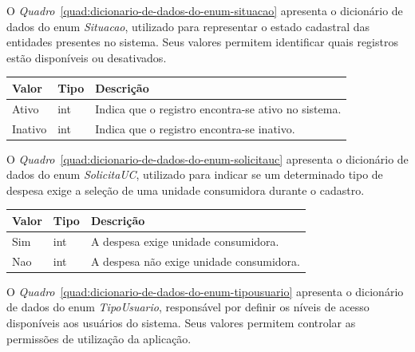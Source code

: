 O \textit{Quadro}~\ref{quad:dicionario-de-dados-do-enum-situacao} apresenta o dicionário de dados do enum \textit{Situacao}, utilizado para representar o estado cadastral das entidades presentes no sistema. Seus valores permitem identificar quais registros estão disponíveis ou desativados.

\begin{quadro}[H]
\caption[Dicionário de dados do enum Situacao]{Dicionário de dados do enum Situacao}
\label{quad:dicionario-de-dados-do-enum-situacao}

\begin{tabular}{|p{}|p{}|p{}|}
\hline
\textbf{Valor} & \textbf{Tipo} & \textbf{Descrição} \\ 
\hline
Ativo & int & Indica que o registro encontra-se ativo no sistema. \\ 
\hline
Inativo & int & Indica que o registro encontra-se inativo. \\ 
\hline
\end{tabular}


\end{quadro}


O \textit{Quadro}~\ref{quad:dicionario-de-dados-do-enum-solicitauc} apresenta o dicionário de dados do enum \textit{SolicitaUC}, utilizado para indicar se um determinado tipo de despesa exige a seleção de uma unidade consumidora durante o cadastro.

\begin{quadro}[H]
\caption[Dicionário de dados do enum SolicitaUC]{Dicionário de dados do enum SolicitaUC}
\label{quad:dicionario-de-dados-do-enum-solicitauc}

\begin{tabular}{|p{}|p{}|p{}|}
\hline
\textbf{Valor} & \textbf{Tipo} & \textbf{Descrição} \\ 
\hline
Sim & int & A despesa exige unidade consumidora. \\ 
\hline
Nao & int & A despesa não exige unidade consumidora. \\ 
\hline
\end{tabular}


\end{quadro}


O \textit{Quadro}~\ref{quad:dicionario-de-dados-do-enum-tipousuario} apresenta o dicionário de dados do enum \textit{TipoUsuario}, responsável por definir os níveis de acesso disponíveis aos usuários do sistema. Seus valores permitem controlar as permissões de utilização da aplicação.

